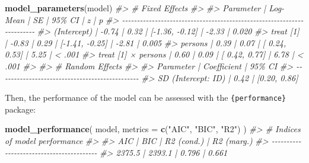 \documentclass{article}
\newenvironment{Shaded}{\begin{snugshade}}{\end{snugshade}}
\newcommand{\AttributeTok}[1]{\textcolor[rgb]{0.13,0.29,0.53}{#1}}
\newcommand{\CommentTok}[1]{\textcolor[rgb]{0.56,0.35,0.01}{\textit{#1}}}
\newcommand{\FunctionTok}[1]{\textcolor[rgb]{0.13,0.29,0.53}{\textbf{#1}}}
\newcommand{\NormalTok}[1]{#1}
\newcommand{\StringTok}[1]{\textcolor[rgb]{0.31,0.60,0.02}{#1}}
\begin{document}
\begin{Shaded}
\begin{Highlighting}[]
\FunctionTok{model\_parameters}\NormalTok{(model)}
\CommentTok{\#\textgreater{} \# Fixed Effects}
\CommentTok{\#\textgreater{} }
\CommentTok{\#\textgreater{} Parameter           | Log{-}Mean |   SE |         95\% CI |     z |      p}
\CommentTok{\#\textgreater{} {-}{-}{-}{-}{-}{-}{-}{-}{-}{-}{-}{-}{-}{-}{-}{-}{-}{-}{-}{-}{-}{-}{-}{-}{-}{-}{-}{-}{-}{-}{-}{-}{-}{-}{-}{-}{-}{-}{-}{-}{-}{-}{-}{-}{-}{-}{-}{-}{-}{-}{-}{-}{-}{-}{-}{-}{-}{-}{-}{-}{-}{-}{-}{-}{-}{-}{-}{-}{-}{-}{-}}
\CommentTok{\#\textgreater{} (Intercept)         |    {-}0.74 | 0.32 | [{-}1.36, {-}0.12] | {-}2.33 | 0.020 }
\CommentTok{\#\textgreater{} treat [1]           |    {-}0.83 | 0.29 | [{-}1.41, {-}0.25] | {-}2.81 | 0.005 }
\CommentTok{\#\textgreater{} persons             |     0.39 | 0.07 | [ 0.24,  0.53] |  5.25 | \textless{} .001}
\CommentTok{\#\textgreater{} treat [1] × persons |     0.60 | 0.09 | [ 0.42,  0.77] |  6.78 | \textless{} .001}
\CommentTok{\#\textgreater{} }
\CommentTok{\#\textgreater{} \# Random Effects}
\CommentTok{\#\textgreater{} }
\CommentTok{\#\textgreater{} Parameter          | Coefficient |       95\% CI}
\CommentTok{\#\textgreater{} {-}{-}{-}{-}{-}{-}{-}{-}{-}{-}{-}{-}{-}{-}{-}{-}{-}{-}{-}{-}{-}{-}{-}{-}{-}{-}{-}{-}{-}{-}{-}{-}{-}{-}{-}{-}{-}{-}{-}{-}{-}{-}{-}{-}{-}{-}{-}}
\CommentTok{\#\textgreater{} SD (Intercept: ID) |        0.42 | [0.20, 0.86]}
\end{Highlighting}
\end{Shaded}

Then, the performance of the model can be assessed with the
\texttt{\{performance\}} package:

\begin{Shaded}
\begin{Highlighting}[]
\FunctionTok{model\_performance}\NormalTok{(}
\NormalTok{  model,}
  \AttributeTok{metrics =} \FunctionTok{c}\NormalTok{(}\StringTok{"AIC"}\NormalTok{, }\StringTok{"BIC"}\NormalTok{, }\StringTok{"R2"}\NormalTok{)}
\NormalTok{)}
\CommentTok{\#\textgreater{} \# Indices of model performance}
\CommentTok{\#\textgreater{} }
\CommentTok{\#\textgreater{} AIC    |    BIC | R2 (cond.) | R2 (marg.)}
\CommentTok{\#\textgreater{} {-}{-}{-}{-}{-}{-}{-}{-}{-}{-}{-}{-}{-}{-}{-}{-}{-}{-}{-}{-}{-}{-}{-}{-}{-}{-}{-}{-}{-}{-}{-}{-}{-}{-}{-}{-}{-}{-}{-}{-}{-}}
\CommentTok{\#\textgreater{} 2375.5 | 2393.1 |      0.796 |      0.661}
\end{Highlighting}
\end{Shaded}
\end{document}
